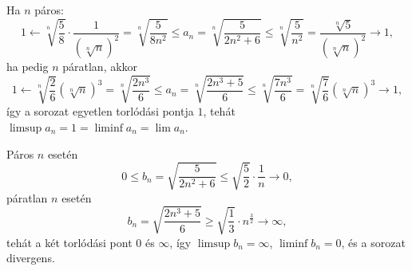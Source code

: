 \documentclass[11pt]{scrartcl}
\begin{document}
Ha $n$ páros:
\[
	1
	\leftarrow \sqrt[n]{\frac{5}{8}} \cdot \frac{1}{\left(\sqrt[n]{n}\right)^2}
	= \sqrt[n]{\frac{5}{8n^2}}
	\le a_n
	= \sqrt[n]{\frac{5}{2n^2 + 6}}
	\le \sqrt[n]{\frac{5}{n^2}}
	= \frac{\sqrt[n]{5}}{\left(\sqrt[n]{n}\right)^2}
	\to 1,
\]
ha pedig $n$ páratlan, akkor
\[
	1
	\leftarrow \sqrt[n]{\frac{2}{6}} \left(\sqrt[n]{n}\right)^3
	= \sqrt[n]{\frac{2n^3}{6}}
	\le a_n
	= \sqrt[n]{\frac{2n^3 + 5}{6}}
	\le \sqrt[n]{\frac{7n^3}{6}}
	= \sqrt[n]{\frac{7}{6}} \left(\sqrt[n]{n}\right)^3
	\to 1,
\]
így a sorozat egyetlen torlódási pontja $1$, tehát
$\limsup a_n = 1 = \liminf a_n = \lim a_n$.

Páros $n$ esetén
\[
	0 \le b_n = \sqrt{\frac{5}{2n^2 + 6}} \le \sqrt{\frac{5}{2}} \cdot \frac{1}{n} \to 0,
\]
páratlan $n$ esetén
\[
	b_n = \sqrt{\frac{2n^3 + 5}{6}} \ge \sqrt{\frac{1}{3}} \cdot n^{\frac{3}{2}} \to \infty,
\]
tehát a két torlódási pont $0$ és $\infty$, így $\limsup b_n = \infty$,
$\liminf b_n = 0$, és a sorozat divergens.
\end{document}
